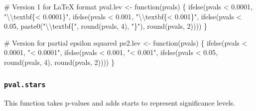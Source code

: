\documentclass[
  bookmarksnumbered]{article}
\newenvironment{Shaded}{\begin{snugshade}}{\end{snugshade}}
\newcommand{\CommentTok}[1]{\textcolor[rgb]{0.50,0.62,0.50}{#1}}
\newcommand{\ControlFlowTok}[1]{\textcolor[rgb]{0.94,0.87,0.69}{#1}}
\newcommand{\DecValTok}[1]{\textcolor[rgb]{0.86,0.86,0.80}{#1}}
\newcommand{\FloatTok}[1]{\textcolor[rgb]{0.75,0.75,0.82}{#1}}
\newcommand{\FunctionTok}[1]{\textcolor[rgb]{0.94,0.94,0.56}{#1}}
\newcommand{\NormalTok}[1]{\textcolor[rgb]{0.80,0.80,0.80}{#1}}
\newcommand{\OtherTok}[1]{\textcolor[rgb]{0.94,0.94,0.56}{#1}}
\newcommand{\SpecialCharTok}[1]{\textcolor[rgb]{0.86,0.64,0.64}{#1}}
\newcommand{\StringTok}[1]{\textcolor[rgb]{0.80,0.58,0.58}{#1}}
\begin{document}
\begin{Shaded}
\begin{Highlighting}[]
\CommentTok{\# Version 1 for LaTeX format}
\NormalTok{pval.lev }\OtherTok{\textless{}{-}} \ControlFlowTok{function}\NormalTok{(pvals) \{}
  \FunctionTok{ifelse}\NormalTok{(pvals }\SpecialCharTok{\textless{}} \FloatTok{0.0001}\NormalTok{, }\StringTok{"}\SpecialCharTok{\textbackslash{}\textbackslash{}}\StringTok{textbf\{\textless{} 0.0001\}"}\NormalTok{,}
         \FunctionTok{ifelse}\NormalTok{(pvals }\SpecialCharTok{\textless{}} \FloatTok{0.001}\NormalTok{, }\StringTok{"}\SpecialCharTok{\textbackslash{}\textbackslash{}}\StringTok{textbf\{\textless{} 0.001\}"}\NormalTok{,}
                \FunctionTok{ifelse}\NormalTok{(pvals }\SpecialCharTok{\textless{}} \FloatTok{0.05}\NormalTok{, }\FunctionTok{paste0}\NormalTok{(}\StringTok{"}\SpecialCharTok{\textbackslash{}\textbackslash{}}\StringTok{textbf\{"}\NormalTok{, }\FunctionTok{round}\NormalTok{(pvals, }\DecValTok{4}\NormalTok{), }\StringTok{"\}"}\NormalTok{),}
                       \FunctionTok{round}\NormalTok{(pvals, }\DecValTok{2}\NormalTok{))))}
\NormalTok{\}}


\CommentTok{\# Version for partial epsilon squared}
\NormalTok{pe2.lev }\OtherTok{\textless{}{-}} \ControlFlowTok{function}\NormalTok{(pvals) \{}
  \FunctionTok{ifelse}\NormalTok{(pvals }\SpecialCharTok{\textless{}} \FloatTok{0.0001}\NormalTok{, }\StringTok{"\textless{} 0.0001"}\NormalTok{,}
         \FunctionTok{ifelse}\NormalTok{(pvals }\SpecialCharTok{\textless{}} \FloatTok{0.001}\NormalTok{, }\StringTok{"\textless{} 0.001"}\NormalTok{,}
                \FunctionTok{ifelse}\NormalTok{(pvals }\SpecialCharTok{\textless{}} \FloatTok{0.05}\NormalTok{, }\FunctionTok{round}\NormalTok{(pvals, }\DecValTok{4}\NormalTok{), }
                       \FunctionTok{round}\NormalTok{(pvals, }\DecValTok{2}\NormalTok{))))}
\NormalTok{\}}
\end{Highlighting}
\end{Shaded}

\subsubsection{\texorpdfstring{\texttt{pval.stars}}{pval.stars}}\label{pval.stars}

This function takes p-values and adds starts to represent significance levels.
\end{document}
